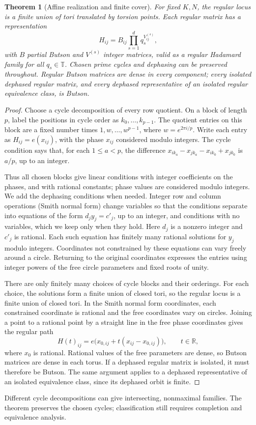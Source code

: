 \documentclass[11pt,a4paper]{article}
\newtheorem{theorem}{Theorem}[section]
\theoremstyle{plain}
\theoremstyle{definition}
\numberwithin{equation}{section}
\begin{document}
\begin{theorem}[Affine realization and finite cover]\label{bg:affinerealization}\label{bg:finitecover}\label{bg:densityisolation}
For fixed $K,N$, the regular locus is a finite union of tori translated by torsion points. Each regular matrix has a representation
$$H_{ij}=B_{ij}\prod_{s=1}^d q_s^{V^{(s)}_{ij}},$$
with $B$ partial Butson and $V^{(s)}$ integer matrices, valid as a regular Hadamard family for all $q_s\in\mathbb T$. Chosen prime cycles and dephasing can be preserved throughout. Regular Butson matrices are dense in every component; every isolated dephased regular matrix, and every dephased representative of an isolated regular equivalence class, is Butson.
\end{theorem}
\begin{proof}
Choose a cycle decomposition of every row quotient. On a block of length $p$, label the positions in cycle order as $k_0,\ldots,k_{p-1}$. The quotient entries on this block are a fixed number times $1,w,\ldots,w^{p-1}$, where $w=e^{2\pi i/p}$. Write each entry as $H_{ij}=e(x_{ij})$, with the phase $x_{ij}$ considered modulo integers. The cycle condition says that, for each $1\leq a<p$, the difference $x_{ik_a}-x_{jk_a}-x_{ik_0}+x_{jk_0}$ is $a/p$, up to an integer.

Thus all chosen blocks give linear conditions with integer coefficients on the phases, and with rational constants; phase values are considered modulo integers. We add the dephasing conditions when needed. Integer row and column operations (Smith normal form) change variables so that the conditions separate into equations of the form $d_jy_j=c'_j$, up to an integer, and conditions with no variables, which we keep only when they hold. Here $d_j$ is a nonzero integer and $c'_j$ is rational. Each such equation has finitely many rational solutions for $y_j$ modulo integers. Coordinates not constrained by these equations can vary freely around a circle. Returning to the original coordinates expresses the entries using integer powers of the free circle parameters and fixed roots of unity.

There are only finitely many choices of cycle blocks and their orderings. For each choice, the solutions form a finite union of closed tori, so the regular locus is a finite union of closed tori. In the Smith normal form coordinates, each constrained coordinate is rational and the free coordinates vary on circles. Joining a point to a rational point by a straight line in the free phase coordinates gives the regular path
$$H(t)_{ij}=e\bigl(x_{0,ij}+t(x_{ij}-x_{0,ij})\bigr),\qquad t\in\mathbb R,$$
where $x_0$ is rational. Rational values of the free parameters are dense, so Butson matrices are dense in each torus. If a dephased regular matrix is isolated, it must therefore be Butson. The same argument applies to a dephased representative of an isolated equivalence class, since its dephased orbit is finite.
\end{proof}
\label{bg:scope}Different cycle decompositions can give intersecting, nonmaximal families. The theorem preserves the chosen cycles; classification still requires completion and equivalence analysis.
\end{document}
